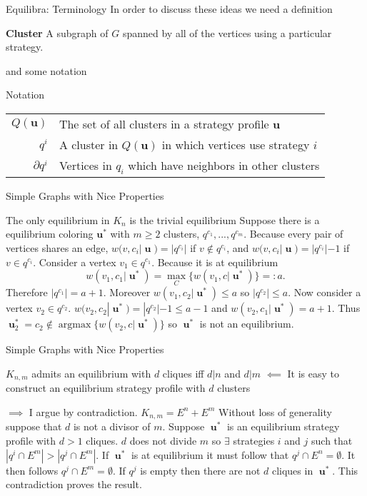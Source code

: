 \documentclass{beamer}
\DeclareMathOperator*{\argmax}{\text{argmax}}
\DeclareMathOperator{\uu}{\mathbf{u}}
\begin{document}
\begin{frame}
	{Equilibra: Terminology} %
	In order to discuss these ideas we need a definition
	\begin{block}{\textbf{Cluster}}
		A subgraph of $G$ spanned by all of the vertices using a particular strategy. 
	\end{block}  
	and some notation
	\begin{block}{Notation}
		\begin{tabular}{rp{9cm}} 
			$Q(\mathbf{u})$& The set of all clusters in a strategy profile $\mathbf{u}$ \\
			$q^i$& A cluster in $Q(\mathbf{u})$ in which vertices use strategy $i$\\
			$\partial q^i$& Vertices in $q_i$ which have neighbors in other clusters\\
		\end{tabular}
	\end{block}
\end{frame} 	
\begin{frame}{Simple Graphs with Nice Properties}
	\begin{block}{The only equilibrium in $K_n$ is the trivial equilibrium}
		Suppose there is a equilibrium coloring $\mathbf{u^*}$ with $m\geq2$ clusters, $q^{c_1},...,q^{c_m}$. Because every pair of vertices shares an edge, $w(v,c_i|\uu)=|q^{c_i}|$ if $v\notin q^{c_i}$, and $w(v,c_i|\uu)=|q^{c_i}|-1$ if $v\in q^{c_i}$.  Consider a vertex $v_1\in q^{c_1}$. Because it is at equilibrium $$w(v_1,c_1|\uu^*)=\max_C\{w(v_1,c|\uu^*)\}=:a.$$
		Therefore $|q^{c_1}|=a+1$. Moreover $w(v_1,c_2|\uu^*)\leq a$ so $|q^{c_2}|\leq a$.
		Now consider a vertex  $v_2\in q^{c_2}$. $w(v_2,c_2|\uu^*)=|q^{c_2}|-1\leq a-1$ and $w(v_2,c_1|\uu^*)=a+1$. 
		Thus $\uu^*_2=c_2\notin \argmax\{w(v_2,c|\uu^*)\}$ so $\uu^*$ is not an equilibrium.  
	\end{block}
\end{frame}

\begin{frame}{Simple Graphs with Nice Properties}
	\begin{block}{$K_{n,m}$ admits an equilibrium with $d$ cliques iff $d|n$ and $d|m$}
		$\impliedby$ It is easy to construct an equilibrium strategy profile with $d$ clusters
		
		$\implies$ I argue by contradiction. $K_{n,m}=E^n+E^m$  Without loss of generality suppose that $d$ is not a divisor of $m$. Suppose $\uu^*$ is an equilibrium strategy profile with $d>1$ cliques. $d$ does not divide $m$ so $\exists$ strategies $i$ and $j$ such that $|q^i\cap E^m|>|q^j\cap E^m|$. If $\uu^*$ is at equilibrium it must follow that $q^j\cap E^n=\emptyset$. It then follows $q^j\cap E^m =\emptyset$. If $q^j$ is empty then there are not $d$ cliques in $\uu^*$. This contradiction proves the result.   
	\end{block}
\end{frame}
\end{document}
